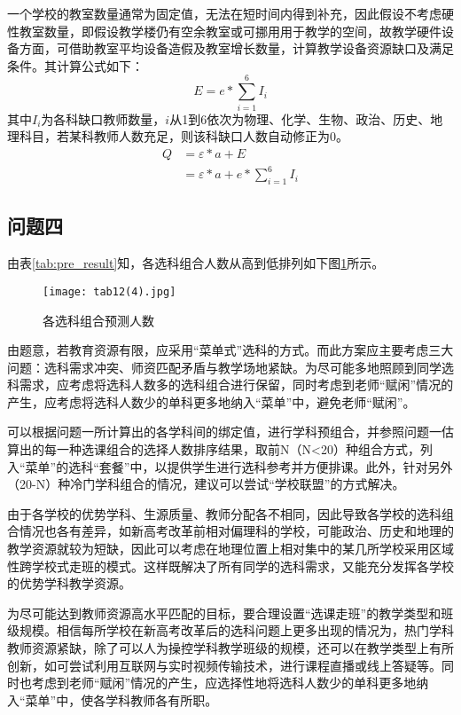 \documentclass[bwprint]{cumcmthesis}
\begin{document}
一个学校的教室数量通常为固定值，无法在短时间内得到补充，因此假设不考虑硬性教室数量，即假设教学楼仍有空余教室或可挪用用于教学的空间，故教学硬件设备方面，可借助教室平均设备造假及教室增长数量，计算教学设备资源缺口及满足条件。其计算公式如下：
\begin{equation}
E = e*\sum\limits_{i=1}^{6}I_i
\end{equation}
其中$I_i$为各科缺口教师数量，$i$从1到6依次为物理、化学、生物、政治、历史、地理科目，若某科教师人数充足，则该科缺口人数自动修正为0。
\begin{align}
Q&=\varepsilon*a+E \\ 
&= \varepsilon*a+e*\sum\limits_{i=1}^{6}I_i
\end{align}


\subsection{问题四}
由表\ref{tab:pre_result}知，各选科组合人数从高到低排列如下图\ref{fig:preResult}所示。

\begin{figure}[!ht]
	\centering

	\texttt{[image: tab12(4).jpg]}
	\caption{各选科组合预测人数}
	\label{fig:preResult}
\end{figure}

由题意，若教育资源有限，应采用“菜单式”选科的方式。而此方案应主要考虑三大问题：选科需求冲突、师资匹配矛盾与教学场地紧缺。为尽可能多地照顾到同学选科需求，应考虑将选科人数多的选科组合进行保留，同时考虑到老师“赋闲”情况的产生，应考虑将选科人数少的单科更多地纳入“菜单”中，避免老师“赋闲”。

可以根据问题一所计算出的各学科间的绑定值，进行学科预组合，并参照问题一估算出的每一种选课组合的选择人数排序结果，取前N（N<20）种组合方式，列入“菜单”的选科“套餐”中，以提供学生进行选科参考并方便排课。此外，针对另外（20-N）种冷门学科组合的情况，建议可以尝试“学校联盟”的方式解决。

由于各学校的优势学科、生源质量、教师分配各不相同，因此导致各学校的选科组合情况也各有差异，如新高考改革前相对偏理科的学校，可能政治、历史和地理的教学资源就较为短缺，因此可以考虑在地理位置上相对集中的某几所学校采用区域性跨学校式走班的模式。这样既解决了所有同学的选科需求，又能充分发挥各学校的优势学科教学资源。

为尽可能达到教师资源高水平匹配的目标，要合理设置“选课走班”的教学类型和班级规模。相信每所学校在新高考改革后的选科问题上更多出现的情况为，热门学科教师资源紧缺，除了可以人为操控学科教学班级的规模，还可以在教学类型上有所创新，如可尝试利用互联网与实时视频传输技术，进行课程直播或线上答疑等。同时也考虑到老师“赋闲”情况的产生，应选择性地将选科人数少的单科更多地纳入“菜单”中，使各学科教师各有所职。
\end{document}
